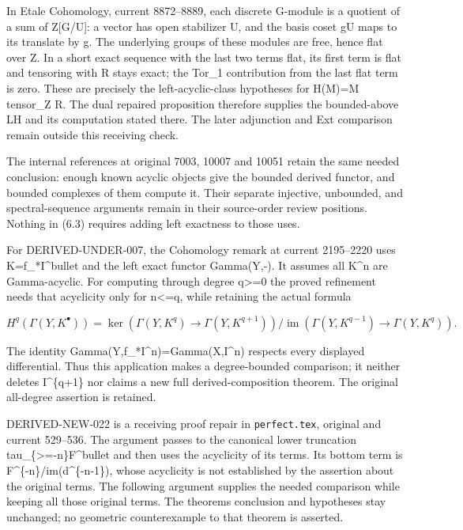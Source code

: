 In Etale Cohomology,\allowbreak{} current 8872–\allowbreak{}8889,\allowbreak{} each discrete G-module is a quotient of a sum of Z[G/\allowbreak{}U]\allowbreak{}:\allowbreak{} a vector has open stabilizer U,\allowbreak{} and the basis coset gU maps to its translate by g. The underlying groups of these modules are free,\allowbreak{} hence flat over Z. In a short exact sequence with the last two terms flat,\allowbreak{} its first term is flat and tensoring with R stays exact; the Tor\_\allowbreak{}1 contribution from the last flat term is zero. These are precisely the left-acyclic-class hypotheses for H(M)\allowbreak{}\allowbreak{}=M tensor\_\allowbreak{}Z R. The dual repaired proposition therefore supplies the bounded-above LH and its computation stated there. The later adjunction and Ext comparison remain outside this receiving check.

The internal references at original 7003,\allowbreak{} 10007 and 10051 retain the same needed conclusion:\allowbreak{} enough known acyclic objects give the bounded derived functor,\allowbreak{} and bounded complexes of them compute it. Their separate injective,\allowbreak{} unbounded,\allowbreak{} and spectral-sequence arguments remain in their source-order review positions. Nothing in (6.3)\allowbreak{} requires adding left exactness to those uses.

For DERIVED-UNDER-007,\allowbreak{} the Cohomology remark at current 2195–\allowbreak{}2220 uses K\allowbreak{}=f\_\allowbreak{}*I\textasciicircum{}bullet and the left exact functor Gamma(Y,\allowbreak{}-)\allowbreak{}. It assumes all K\^{}n are Gamma-acyclic. For computing through degree q>\allowbreak{}=0 the proved refinement needs that acyclicity only for n<\allowbreak{}=q,\allowbreak{} while retaining the actual formula

\[
 H^q(\Gamma(Y,K^\bullet))=
 \ker(\Gamma(Y,K^q)\to\Gamma(Y,K^{q+1}))\big/
 \operatorname{im}(\Gamma(Y,K^{q-1})\to\Gamma(Y,K^q)).     \tag{7.1}
\]

The identity Gamma(Y,\allowbreak{}f\_\allowbreak{}*I\textasciicircum{}n)\allowbreak{}\allowbreak{}=Gamma(X,\allowbreak{}I\textasciicircum{}n)\allowbreak{} respects every displayed differential. Thus this application makes a degree-bounded comparison; it neither deletes I\textasciicircum{}\{q\allowbreak{}+1\} nor claims a new full derived-composition theorem. The original all-degree assertion is retained.

DERIVED-NEW-022 is a receiving proof repair in \texttt{perfect.\allowbreak{}tex},\allowbreak{} original and current 529–\allowbreak{}536. The argument passes to the canonical lower truncation tau\_\allowbreak{}\{>\allowbreak{}=-n\}F\textasciicircum{}bullet and then uses the acyclicity of its terms. Its bottom term is F\textasciicircum{}\{-n\}/\allowbreak{}im(d\textasciicircum{}\{-n-1\})\allowbreak{},\allowbreak{} whose acyclicity is not established by the assertion about the original terms. The following argument supplies the needed comparison while keeping all those original terms. The theorem\textquotesingle s conclusion and hypotheses stay unchanged; no geometric counterexample to that theorem is asserted.

